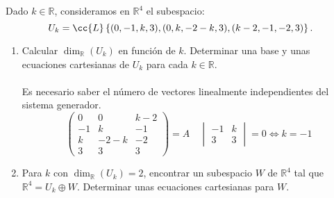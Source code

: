 \begin{ejercicio}
	Dado $k \in \mathbb{R}$, consideramos en $\mathbb{R}^4$ el subespacio:
	\[
		U_k = \cc{L}\left\{ (0, -1, k, 3), (0, k, -2 - k, 3), (k-2, -1, -2, 3) \right\}.
	\]
	\begin{enumerate}
		\item Calcular $\dim_{\mathbb{R}}(U_k)$ en función de $k$. Determinar una base y unas ecuaciones cartesianas de $U_k$ para cada $k \in \mathbb{R}$.
		      \\ \\
		      Es necesario saber el número de vectores linealmente independientes del sistema generador.
		      \begin{equation*}
			      \begin{pmatrix}
				      0  & 0    & k-2 \\
				      -1 & k    & -1  \\
				      k  & -2-k & -2  \\
				      3  & 3    & 3
			      \end{pmatrix} = A \quad \begin{vmatrix}
				      -1 & k \\
				      3  & 3
			      \end{vmatrix} = 0 \Leftrightarrow k = -1
		      \end{equation*}
		\item Para $k$ con $\dim_{\mathbb{R}}(U_k) = 2$, encontrar un subespacio $W$ de $\mathbb{R}^4$ tal que $\mathbb{R}^4 = U_k \oplus W$. Determinar unas ecuaciones cartesianas para $W$.
	\end{enumerate}
\end{ejercicio}
\newpage
